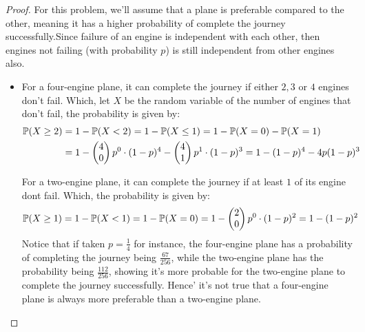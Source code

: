 \documentclass{article}
\begin{document}
\begin{proof}
    For this problem, we'll assume that a plane is preferable compared to the other, meaning it has a higher probability of complete the journey successfully.Since failure of an engine is independent with each other, then engines not failing (with probability $p$) is still independent from other engines also.

    \begin{itemize}
        \item[(a)] For a four-engine plane, it can complete the journey if either $2,3$ or $4$ engines don't fail. Which, let $X$ be the random variable of the number of engines that don't fail, the probability is given by:
        \begin{align}
            \mathbb{P}(X\geq 2) &= 1-\mathbb{P}(X<2) = 1-\mathbb{P}(X\leq 1) = 1- \mathbb{P}(X=0) - \mathbb{P}(X=1)\\
            &= 1 - \begin{pmatrix}4\\0\end{pmatrix}p^0\cdot (1-p)^4 - \begin{pmatrix}4\\1\end{pmatrix}p^1\cdot (1-p)^3 = 1-(1-p)^4 - 4p(1-p)^3
        \end{align}

        For a two-engine plane, it can complete the journey if at least $1$ of its engine dont fail. Which, the probability is given by:
        \begin{align}
            \mathbb{P}(X\geq 1)&= 1-\mathbb{P}(X<1) = 1-\mathbb{P}(X=0) = 1-\begin{pmatrix}2\\0\end{pmatrix}p^0\cdot (1-p)^2 = 1-(1-p)^2
        \end{align}
        Notice that if taken $p=\frac{1}{4}$ for instance, the four-engine plane has a probability of completing the journey being $\frac{67}{256}$, while the two-engine plane has the probability being $\frac{112}{256}$, showing it's more probable for the two-engine plane to complete the journey successfully. Hence' it's not true that a four-engine plane is always more preferable than a two-engine plane.


\end{itemize}
\end{proof}
\end{document}
